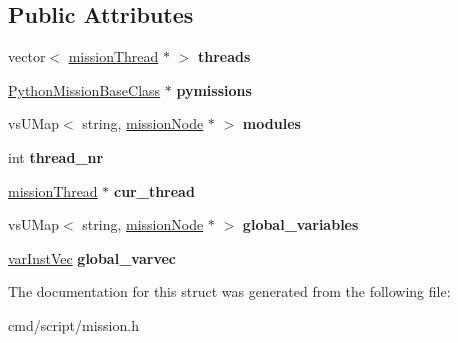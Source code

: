 \subsection*{Public Attributes}
\begin{DoxyCompactItemize}
\item 
vector$<$ \hyperlink{classmissionThread}{mission\+Thread} $\ast$ $>$ {\bfseries threads}\hypertarget{structMission_1_1Runtime_a34550c572434612c8a0c01f86d30a5a0}{}\label{structMission_1_1Runtime_a34550c572434612c8a0c01f86d30a5a0}

\item 
\hyperlink{classPythonMissionBaseClass}{Python\+Mission\+Base\+Class} $\ast$ {\bfseries pymissions}\hypertarget{structMission_1_1Runtime_a11f2112e79960f7bfa93982856b537ae}{}\label{structMission_1_1Runtime_a11f2112e79960f7bfa93982856b537ae}

\item 
vs\+U\+Map$<$ string, \hyperlink{classmissionNode}{mission\+Node} $\ast$ $>$ {\bfseries modules}\hypertarget{structMission_1_1Runtime_a069d97582e246c3a02d66f415a409e18}{}\label{structMission_1_1Runtime_a069d97582e246c3a02d66f415a409e18}

\item 
int {\bfseries thread\+\_\+nr}\hypertarget{structMission_1_1Runtime_ad5f10795e0793c8ac45b6f2e46920408}{}\label{structMission_1_1Runtime_ad5f10795e0793c8ac45b6f2e46920408}

\item 
\hyperlink{classmissionThread}{mission\+Thread} $\ast$ {\bfseries cur\+\_\+thread}\hypertarget{structMission_1_1Runtime_a5d6b8d8f45172cbf8370d43ba8584240}{}\label{structMission_1_1Runtime_a5d6b8d8f45172cbf8370d43ba8584240}

\item 
vs\+U\+Map$<$ string, \hyperlink{classmissionNode}{mission\+Node} $\ast$ $>$ {\bfseries global\+\_\+variables}\hypertarget{structMission_1_1Runtime_a552f0bf26ee8b0a5bf7ec43fc1ecde2f}{}\label{structMission_1_1Runtime_a552f0bf26ee8b0a5bf7ec43fc1ecde2f}

\item 
\hyperlink{classvarInstVec}{var\+Inst\+Vec} {\bfseries global\+\_\+varvec}\hypertarget{structMission_1_1Runtime_a5e2ab912dfb9eaf6ad02711d7e5c7199}{}\label{structMission_1_1Runtime_a5e2ab912dfb9eaf6ad02711d7e5c7199}

\end{DoxyCompactItemize}


The documentation for this struct was generated from the following file\+:\begin{DoxyCompactItemize}
\item 
cmd/script/mission.\+h\end{DoxyCompactItemize}
